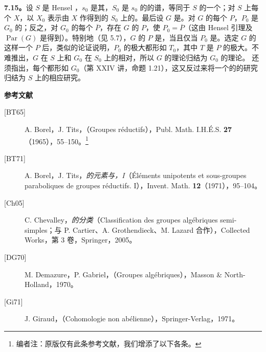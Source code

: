 \textbf{7.15。}设 $S$ 是 Hensel ，$s_0$ 是其，$S_0$ 是 $s_0$ 的的谱，等同于 $S$ 的一个；对 $S$ 上每个 $X$，以 $X_0$ 表示由 $X$ 作得到的 $S_0$ 上的。最后设 $G$ 是。对 $G$ 的每个 $P$，$P_0$ 是 $G_0$ 的；反之，对 $G_0$ 的每个 $\overline P$，存在 $G$ 的 $P$，使 $P_0=\overline P$（这由 Hensel 引理及 $\operatorname{Par}(G)$ 是得到）。特别地（见 5.7），$G$ 的 $P$ 是，当且仅当 $P_0$ 是。选定 $G$ 的这样一个 $P$ 后，类似的论证说明，$P_0$ 的极大都形如 $T_0$，其中 $T$ 是 $P$ 的极大。不难推出，$G$ 在 $S$ 上和 $G_0$ 在 $S_0$ 上的相对，所以 $G$ 的理论归结为 $G_0$ 的理论。
还须指出，每个都形如 $G_0$（第 XXIV 讲，命题 1.21），这又反过来将一个的的研究归结为 $S$ 上的相应研究。

\textbf{参考文献}
\begin{description}
\item[{[BT65]}] A. Borel，J. Tits，\textit{}（Groupes réductifs），Publ. Math. I.H.É.S. \textbf{27}（1965），55--150。\footnote{编者注：原版仅有此条参考文献，我们增添了以下各条。}
\item[{[BT71]}] A. Borel，J. Tits，\textit{的元素与，I}（Éléments unipotents et sous-groupes paraboliques de groupes réductifs. I），Invent. Math. \textbf{12}（1971），95--104。
\item[{[Ch05]}] C. Chevalley，\textit{的分类}（Classification des groupes algébriques semi-simples；与 P. Cartier、A. Grothendieck、M. Lazard 合作），Collected Works，第 3 卷，Springer，2005。
\item[{[DG70]}] M. Demazure，P. Gabriel，\textit{}（Groupes algébriques），Masson \& North-Holland，1970。
\item[{[Gi71]}] J. Giraud，\textit{}（Cohomologie non abélienne），Springer-Verlag，1971。
\end{description}

